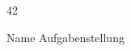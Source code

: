 \documentclass{scrartcl}
\begin{document}
    \begin{ukon-infie}[Abgabedatum]{42}

        \begin{exercise}[p=1,z=2]{Name} %
        	Aufgabenstellung
        \end{exercise}

    \end{ukon-infie}
\end{document}
